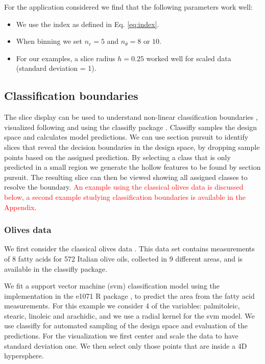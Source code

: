 \documentclass[]{interact}
\theoremstyle{plain}%
\theoremstyle{definition}
\theoremstyle{remark}
\def\tightlist{}
\begin{document}
For the application considered we find that the following parameters
work well:

\begin{itemize}
\tightlist
\item
  We use the index as defined in Eq. \ref{eq:index}.
\item
  When binning we set \(n_r=5\) and \(n_{\theta}=8\) or \(10\).
\item
  For our examples, a slice radius \(h=0.25\) worked well for scaled
  data (standard deviation = 1).
\end{itemize}

\hypertarget{classification-boundaries}{%
\subsection{Classification boundaries}\label{classification-boundaries}}

The slice display can be used to understand non-linear classification
boundaries \citep{laa2019slice}, visualized following \citet{sam.11271}
and using the classifly package \citep{classifly}. Classifly samples the
design space and calculates model predictions. We can use section
pursuit to identify slices that reveal the decision boundaries in the
design space, by dropping sample points based on the assigned
prediction. By selecting a class that is only predicted in a small
region we generate the hollow features to be found by section pursuit.
The resulting slice can then be viewed showing all assigned classes to
resolve the boundary.
\textcolor{red}{An example using the classical olives data is discussed below, a second example studying classification boundaries is available in the Appendix.}

\hypertarget{sec:olives}{%
\subsubsection*{Olives data}\label{sec:olives}}

We first consider the classical olives data \citep{olives}. This data
set contains measurements of 8 fatty acids for 572 Italian olive oils,
collected in 9 different areas, and is available in the classifly
package.

We fit a support vector machine (svm) classification model using the
implementation in the e1071 R package \citep{e1071}, to predict the area
from the fatty acid measurements. For this example we consider 4 of the
variables: palmitoleic, stearic, linoleic and arachidic, and we use a
radial kernel for the svm model. We use classifly for automated sampling
of the design space and evaluation of the predictions. For the
visualization we first center and scale the data to have standard
deviation one. We then select only those points that are inside a 4D
hypersphere.
\end{document}
